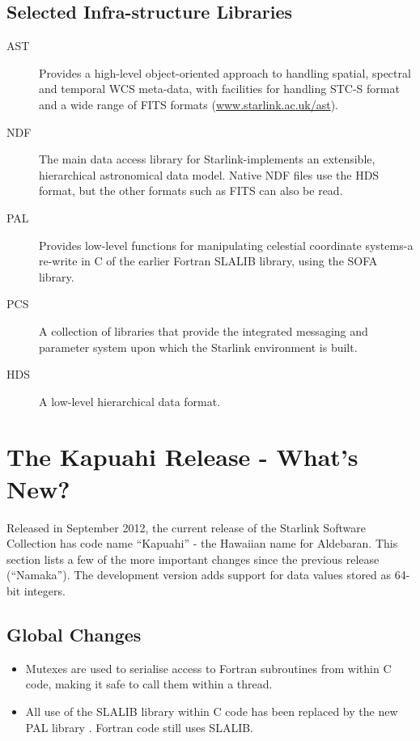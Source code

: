 \documentclass[11pt,twoside]{article}
\begin{document}
\subsection{Selected Infra-structure Libraries}
\begin{description}
\item[AST] Provides a high-level object-oriented approach to handling
spatial, spectral and temporal WCS meta-data, with facilities for
handling STC-S format and a wide range of FITS formats
(\url{www.starlink.ac.uk/ast}).

\item[NDF] The main data access library for Starlink-implements an extensible, hierarchical astronomical data model. Native NDF files use the HDS format, but the other formats such as FITS can also be read.
\item[PAL] Provides low-level functions for manipulating celestial coordinate systems-a re-write in C of the earlier Fortran SLALIB library, using the SOFA library.
\item[PCS] A collection of libraries that provide the integrated messaging and parameter system upon which the Starlink environment is built.
\item[HDS] A low-level hierarchical data format.
\end{description}

\section{The Kapuahi Release - What's New?}
Released in September 2012, the current release of the Starlink Software
Collection has code name ``Kapuahi'' - the Hawaiian name for Aldebaran.
This section lists a few of the more important changes since the previous
release (``Namaka''). The development version adds support for data values
stored as 64-bit integers.

\subsection{Global Changes}
\begin{itemize}
\item Mutexes are used to serialise access to Fortran subroutines from within
C code, making it safe to call them within a thread.
\item All use of the SLALIB library within C code has been replaced by the new
PAL library \citep{P56_adassxxii}. Fortran code still uses SLALIB.
\end{itemize}
\end{document}
